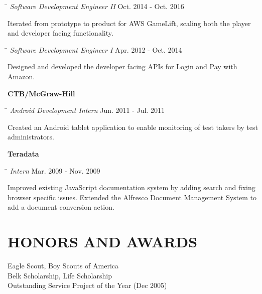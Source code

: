 \documentclass{res}
\begin{document}
\begin{resume}
    \begin{tabbing}\hspace{4.6in}\= \kill
    {\emph{Software Development Engineer II}}      \>Oct. 2014 - Oct. 2016\\
    \end{tabbing}\vspace{-30pt}
    Iterated from prototype to product for AWS GameLift, scaling both the player
    and developer facing functionality.
    \vspace{-10pt}
    
    \begin{tabbing}\hspace{4.6in}\= \kill
    {\emph{Software Development Engineer I}}      \>Apr. 2012 - Oct. 2014\\
    \end{tabbing}\vspace{-30pt}
    Designed and developed the developer facing APIs for Login and Pay with Amazon.

    {\bf CTB/McGraw-Hill}\vspace{-20pt}
    \begin{tabbing}\hspace{4.6in}\= \kill
    {\emph{Android Development Intern}}      \>Jun. 2011 - Jul. 2011\\
    \end{tabbing}\vspace{-30pt}      %
    Created an Android tablet application to enable monitoring of test takers by
    test administrators.

    {\bf Teradata}\vspace{-20pt}
    \begin{tabbing}\hspace{4.6in}\= \kill
    {\emph{Intern}}      \>Mar. 2009 - Nov. 2009\\
    \end{tabbing}\vspace{-30pt}      %
    Improved existing JavaScript documentation system by adding search and fixing browser specific
    issues.  Extended the Alfresco Document Management System to add a document conversion 
    action.

\section{HONORS AND AWARDS}          
    Eagle Scout, Boy Scouts of America \\
    Belk Scholarship, Life Scholarship \\
    Outstanding Service Project of the Year (Dec 2005)   
       

\end{resume}
\end{document}
